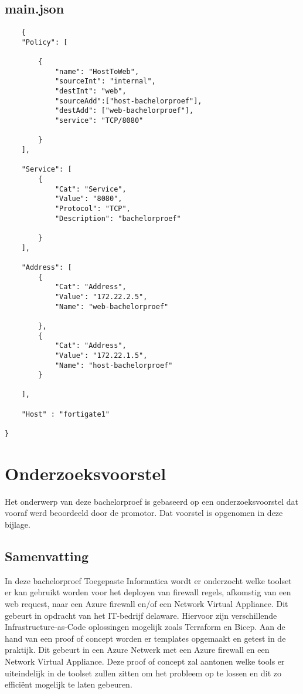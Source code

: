 \documentclass[dutch,dit,thesis]{hogentreport}
\begin{document}
\section{main.json}
\label{code:main.json}

\begin{lstlisting}
    {
    "Policy": [
            
        { 
            "name": "HostToWeb",
            "sourceInt": "internal", 
            "destInt": "web",
            "sourceAdd":["host-bachelorproef"],
            "destAdd": ["web-bachelorproef"],
            "service": "TCP/8080"
            
        }
    ],

    "Service": [
        {
            "Cat": "Service",
            "Value": "8080",
            "Protocol": "TCP",
            "Description": "bachelorproef"

        }
    ],

    "Address": [
        {
            "Cat": "Address",
            "Value": "172.22.2.5",
            "Name": "web-bachelorproef"
            
        },
        {
            "Cat": "Address",
            "Value": "172.22.1.5",
            "Name": "host-bachelorproef"
        }
     
    ],

    "Host" : "fortigate1"
 
}
\end{lstlisting}

\chapter{Onderzoeksvoorstel}

Het onderwerp van deze bachelorproef is gebaseerd op een onderzoeksvoorstel dat vooraf werd beoordeeld door de promotor. Dat voorstel is opgenomen in deze bijlage.

\section*{Samenvatting}

In deze bachelorproef Toegepaste Informatica wordt er onderzocht welke toolset er kan gebruikt worden voor het deployen van firewall regels, afkomstig van een web request, naar een Azure firewall en/of een Network Virtual Appliance. Dit gebeurt in opdracht van het IT-bedrijf delaware. Hiervoor zijn verschillende Infrastructure-as-Code oplossingen mogelijk zoals Terraform en Bicep. Aan de hand van een proof of concept worden er templates opgemaakt en getest in de praktijk. Dit gebeurt in een Azure Netwerk met een Azure firewall en een Network Virtual Appliance. Deze proof of concept zal aantonen welke tools er uiteindelijk in de toolset zullen zitten om het probleem op te lossen en dit zo efficiënt mogelijk te laten gebeuren. 
\end{document}
